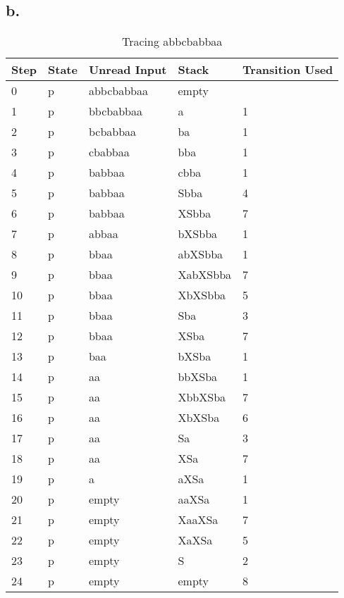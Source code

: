 \documentclass[12pt]{article}
\begin{document}
\subsection*{b.}
\begin{table}[H]
\centering
\caption{Tracing abbcbabbaa}
\label{my-label}
\begin{tabular}{|l|l|l|l|l|}
\hline
Step & State & Unread Input & Stack    & Transition Used \\ \hline
0    & p     & abbcbabbaa   & empty    &                \\ \hline
1    & p     & bbcbabbaa    & a        & 1               \\ \hline
2    & p     & bcbabbaa     & ba       & 1               \\ \hline
3    & p     & cbabbaa      & bba      & 1               \\ \hline
4    & p     & babbaa       & cbba     & 1               \\ \hline
5    & p     & babbaa       & Sbba     & 4               \\ \hline
6    & p     & babbaa       & XSbba    & 7               \\ \hline
7    & p     & abbaa        & bXSbba   & 1               \\ \hline
8    & p     & bbaa         & abXSbba  & 1               \\ \hline
9    & p     & bbaa         & XabXSbba & 7               \\ \hline
10   & p     & bbaa         & XbXSbba  & 5               \\ \hline
11   & p     & bbaa         & Sba      & 3               \\ \hline
12   & p     & bbaa         & XSba     & 7               \\ \hline
13   & p     & baa          & bXSba    & 1               \\ \hline
14   & p     & aa           & bbXSba   & 1               \\ \hline
15   & p     & aa           & XbbXSba  & 7               \\ \hline
16   & p     & aa           & XbXSba   & 6               \\ \hline
17   & p     & aa           & Sa       & 3               \\ \hline
18   & p     & aa           & XSa      & 7               \\ \hline
19   & p     & a            & aXSa     & 1               \\ \hline
20   & p     & empty        & aaXSa    & 1               \\ \hline
21   & p     & empty        & XaaXSa   & 7               \\ \hline
22   & p     & empty        & XaXSa    & 5               \\ \hline
23   & p     & empty        & S        & 2               \\ \hline
24   & p     & empty        & empty    & 8                \\ \hline
\end{tabular}
\end{table}
\end{document}
